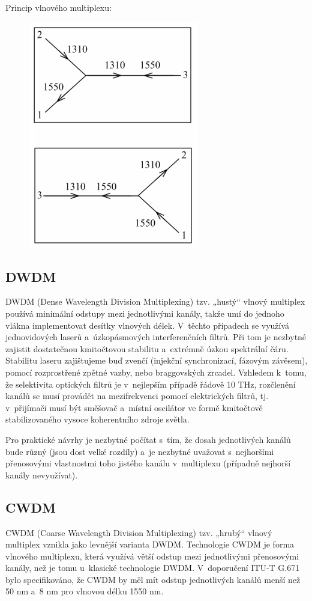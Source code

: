 Princip vlnového multiplexu:
\begin{figure}[!ht]
  \begin{center}
    \includegraphics[scale=0.7]{obrazky/multiplex.png}
  \end{center}
\end{figure}
\subsection{DWDM}
DWDM (Dense Wavelength Division Multiplexing) tzv. „hustý“ vlnový multiplex používá minimální odstupy mezi jednotlivými kanály, takže umí do jednoho vlákna implementovat desítky vlnových délek. V~těchto případech se využívá jednovidových laserů a~úzkopásmových interferenčních filtrů. Při tom je nezbytné zajistit dostatečnou kmitočtovou stabilitu a~extrémně úzkou spektrální čáru. Stabilitu laseru zajištujeme buď zvenčí (injekční synchronizací, fázovým závěsem), pomocí rozprostřené zpětné vazby, nebo braggovských zrcadel. Vzhledem k~tomu, že selektivita optických filtrů je v~nejlepším případě řádově 10 THz, rozčlenění kanálů se musí provádět na mezifrekvenci pomocí elektrických filtrů, tj. v~přijímači musí být směšovač a~místní oscilátor ve formě kmitočtově stabilizovaného vysoce koherentního zdroje světla.

Pro praktické návrhy je nezbytné počítat s~tím, že dosah jednotlivých kanálů bude různý (jsou dost velké rozdíly) a~je nezbytné uvažovat s~nejhoršími přenosovými vlastnostmi toho jistého kanálu v~multiplexu (případně nejhorší kanály nevyužívat).

\subsection{CWDM}
CWDM (Coarse Wavelength Division Multiplexing) tzv. „hrubý“ vlnový multiplex vznikla jako levnější varianta DWDM. Technologie CWDM je forma vlnového multiplexu, která využívá větší odstup mezi jednotlivými přenosovými kanály, než je tomu u~klasické technologie DWDM. V~doporučení ITU-T G.671 bylo specifikováno, že CWDM by měl mít odstup jednotlivých kanálů menší než 50 nm a~8 nm pro vlnovou délku 1550 nm.

